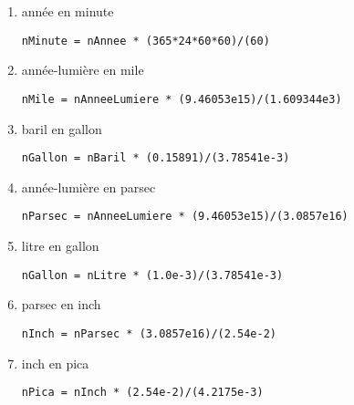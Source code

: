 \documentclass[11pt,a4paper]{article}
\begin{document}
\begin{enumerate}
\item année en minute\hfill
\begin{minipage}[t]{9.5cm}
\begin{Verbatim}
nMinute = nAnnee * (365*24*60*60)/(60)
\end{Verbatim}
\end{minipage}

\item année-lumière en mile\hfill
\begin{minipage}[t]{9.5cm}
\begin{Verbatim}
nMile = nAnneeLumiere * (9.46053e15)/(1.609344e3)
\end{Verbatim}
\end{minipage}

\item baril en gallon\hfill
\begin{minipage}[t]{9.5cm}
\begin{Verbatim}
nGallon = nBaril * (0.15891)/(3.78541e-3)
\end{Verbatim}
\end{minipage}

\item année-lumière en parsec\hfill
\begin{minipage}[t]{9.5cm}
\begin{Verbatim}
nParsec = nAnneeLumiere * (9.46053e15)/(3.0857e16)
\end{Verbatim}
\end{minipage}

\item litre en gallon\hfill
\begin{minipage}[t]{9.5cm}
\begin{Verbatim}
nGallon = nLitre * (1.0e-3)/(3.78541e-3)
\end{Verbatim}
\end{minipage}

\item parsec en inch\hfill
\begin{minipage}[t]{9.5cm}
\begin{Verbatim}
nInch = nParsec * (3.0857e16)/(2.54e-2)
\end{Verbatim}
\end{minipage}

\item inch en pica\hfill
\begin{minipage}[t]{9.5cm}
\begin{Verbatim}
nPica = nInch * (2.54e-2)/(4.2175e-3)
\end{Verbatim}
\end{minipage}


\end{enumerate}
\end{document}
